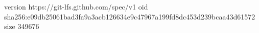 version https://git-lfs.github.com/spec/v1
oid sha256:e09db25061bad3fa9a3acb126634e9c47967a199fd8dc453d239bcaa43d61572
size 349676
